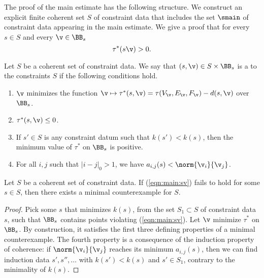 The proof of the main estimate has the following structure.  We
construct an explicit finite coherent set $S$ of constraint data that
includes the set $\smain$ of constraint data appearing in the main
estimate.  We give a proof that for every $s\in S$ and every $\v\in
\BB_s$
\begin{equation}\label{eqn:main:sv}
\tau^*(s\v)> 0.
\end{equation}


\begin{definition}
  Let $S$ be a coherent set of constraint data.  We say that
  $(s,\v)\in S\times\BB_s$ is a  to
  the constraints $S$ if the following conditions hold.
\begin{enumerate}
\item $\v$ minimizes the function $\v\mapsto
  \tau^*(s,\v)=\tau(V_\v,E_\v,F_\v)-d(s,\v)$ over $\BB_s$.
\item  $\tau^*(s,\v)\le 0$.
\item If $s'\in S$ is any constraint datum such that $k(s')<k(s)$, then the
minimum value of $\tau^*$ on $\BB_s$ is positive.
\item For all $i,j$ such that $|i-j|_0>1$, we have $a_{i,j}(s) < \norm{\v_i}{\v_j}$.
\end{enumerate}
\end{definition}

\begin{lemma}
Let $S$ be a coherent set of constraint data.
If (\ref{eqn:main:sv}) fails to hold for some $s\in S$, 
then there exists a minimal counterexample for $S$.
\end{lemma}

\begin{proof}
  Pick some $s$ that minimizes $k(s)$, from the set $S_1\subset S$ of
  constraint data $s$, such that $\BB_s$ contains points violating
  (\ref{eqn:main:sv}).  Let $\v$ minimize $\tau^*$ on $\BB_s$.  By
  construction, it satisfies the first three defining properties of a
  minimal counterexample.  The fourth property is a consequence of the
  induction property of coherence: if $\norm{\v_i}{\v_j}$ reaches its
  minimum $a_{i,j}(s)$, then we can find induction data
  $s',s'',\ldots$ with $k(s')<k(s)$ and $s'\in S_1$, contrary to the
  minimality of $k(s)$.
\end{proof}

